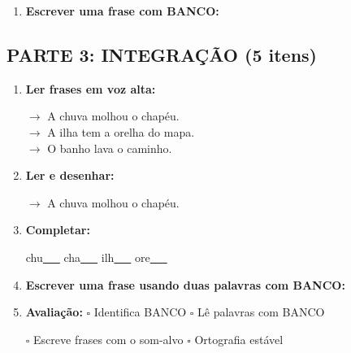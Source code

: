 \begin{exercicio}
\begin{enumerate}[resume]
  \item \textbf{Escrever uma frase com BANCO:}
  \begin{center}
  \underline{\hspace{12cm}}
  \end{center}

\end{enumerate}

\subsection*{PARTE 3: INTEGRAÇÃO (5 itens)}

\begin{enumerate}[resume]

  \item \textbf{Ler frases em voz alta:}
  \begin{center}
  $\rightarrow$ A chuva molhou o chapéu.\\
  $\rightarrow$ A ilha tem a orelha do mapa.\\
  $\rightarrow$ O banho lava o caminho.\\
  \end{center}

  \item \textbf{Ler e desenhar:}
  \begin{center}
  $\rightarrow$ A chuva molhou o chapéu.
  \end{center}
  \begin{center}
  \end{center}

  \item \textbf{Completar:}
  \begin{center}
  chu\underline{~~~} \quad cha\underline{~~~} \quad ilh\underline{~~~} \quad ore\underline{~~~}
  \end{center}

  \item \textbf{Escrever uma frase usando duas palavras com BANCO:}
  \begin{center}
  \underline{\hspace{12cm}}
  \end{center}

  \item \textbf{Avaliação:} $\square$ Identifica BANCO \quad $\square$ Lê palavras com BANCO
  \begin{center}
  $\square$ Escreve frases com o som-alvo \quad $\square$ Ortografia estável
  \end{center}


\end{enumerate}
\end{exercicio}
